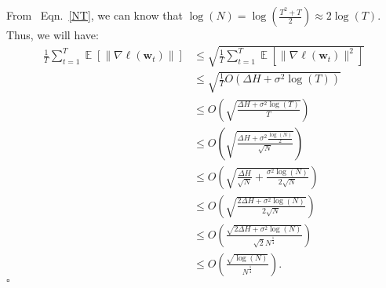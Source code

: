 \documentclass[letterpaper]{article}
\newcommand{\E}{\mathop{\mathbb{E}}}
\newcommand{\bw}{\mathbf{w}}
\newcommand{\refequ}[1]{Eqn.~\eqref{#1}}
\renewcommand{\qedsymbol}{\hfill $\square$}
\begin{document}
\begin{enumerate}
	From ~\refequ{NT}, we can know that $\log{(N)} = \log{(\frac{T^2 + T}{2})} \approx 2\log{(T)}$. Thus, we will have:
	\begin{equation}
		\begin{aligned}
			\frac{1}{T} \sum_{t=1}^T \E[\| \nabla \ell(\bw_t) \|] & \le \sqrt{\frac{1}{T} \sum_{t=1}^T \E[\| \nabla \ell(\bw_t)\|^2]}\\
			& \le \sqrt{\frac{1}{T} O(\Delta H + \sigma^2\log(T))}\\
			& \le O\left(\sqrt{\frac{\Delta H + \sigma^2\log(T)}{T}}\right)\\
			&   \le O\left(\sqrt{\frac{\Delta H + \sigma^2 \frac{\log{(N)}}{2}}{\sqrt{N}}}\right)\\
			&  \le O\left( \sqrt{\frac{\Delta H}{\sqrt{N}}  + \frac{\sigma^2 \log{(N)}}{2\sqrt{N}}}\right)\\
			&  \le O\left(\sqrt{\frac{2\Delta H + \sigma^2 \log{(N)}}{2\sqrt{N}}}\right)\\
			&  \le O\left(\frac{\sqrt{2\Delta H + \sigma^2 \log{(N)}}}{\sqrt{2} N^{\frac{1}{4}}}\right)\\
			& \le O\left( \frac{\sqrt{\log(N)}}{N^{\frac{1}{4}}}\right).
		\end{aligned}
	\end{equation}
	\qedsymbol
\end{enumerate}
\end{document}
